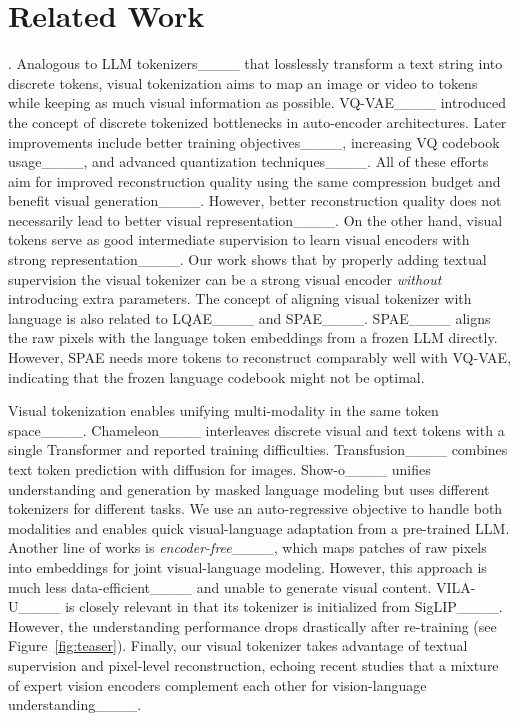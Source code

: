 \section{Related Work}
\label{sec:related}

.
Analogous to LLM tokenizers____ that losslessly transform a text string into discrete tokens, visual tokenization aims to map an image or video to tokens while keeping as much visual information as possible.
VQ-VAE____ introduced the concept of discrete tokenized bottlenecks in auto-encoder architectures.
Later improvements include better training objectives____, increasing VQ codebook usage____, and advanced quantization techniques____.
All of these efforts aim for improved reconstruction quality using the same compression budget and benefit visual generation____.
However, better reconstruction quality does not necessarily lead
to better visual representation____.
On the other hand, visual tokens serve as good intermediate supervision to learn visual encoders with strong representation____.
Our work shows that by properly adding textual supervision the visual tokenizer can be a strong visual encoder \emph{without} introducing extra parameters. 
The concept of aligning visual tokenizer with language is also related to LQAE____ and SPAE____.
SPAE____ aligns the raw pixels with the language token embeddings from a frozen LLM directly.
However, SPAE needs more tokens to reconstruct comparably well with VQ-VAE, indicating that the frozen language codebook might not be optimal.

Visual tokenization enables unifying multi-modality in the same token space____.
Chameleon____ interleaves discrete visual and text tokens with a single Transformer and reported training difficulties.
Transfusion____ combines text token prediction with diffusion for images.
Show-o____ unifies understanding and generation by masked language modeling but uses different tokenizers for different tasks.
We use an auto-regressive objective to handle both modalities and \ours enables quick visual-language adaptation from a pre-trained LLM.
Another line of works is \emph{encoder-free}____, which maps patches of raw pixels into embeddings for joint visual-language modeling.
However, this approach is much less data-efficient____ and unable to generate visual content.
VILA-U____ is closely relevant in that its tokenizer is initialized from SigLIP____.
However, the understanding performance drops drastically after re-training (see Figure~\ref{fig:teaser}).
Finally, our visual tokenizer takes advantage of textual supervision and pixel-level reconstruction, echoing recent studies that a mixture of expert vision encoders complement each other for vision-language understanding____.

